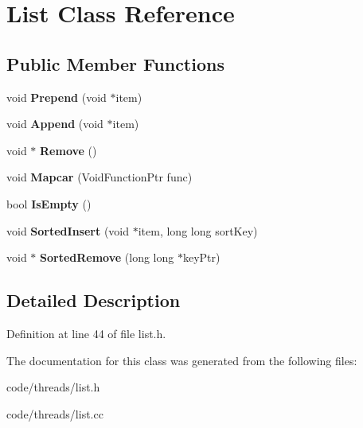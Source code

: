 \section{List Class Reference}
\label{class_list}
\subsection*{Public Member Functions}
\begin{DoxyCompactItemize}
\item 
void {\bfseries Prepend} (void $\ast$item)\label{class_list_a4058cbcd6b63f741faa40e3d782c28a8}

\item 
void {\bfseries Append} (void $\ast$item)\label{class_list_aea4cc7578bb4db7f502dc005e5edc902}

\item 
void $\ast$ {\bfseries Remove} ()\label{class_list_a4f804c07c4cfa4c9b631e6e117156e32}

\item 
void {\bfseries Mapcar} (Void\+Function\+Ptr func)\label{class_list_ab57e90b8b2a790db7f2cad1e7aaa72d3}

\item 
bool {\bfseries Is\+Empty} ()\label{class_list_a854e9656ddbfae181d12f9d9413bc2b8}

\item 
void {\bfseries Sorted\+Insert} (void $\ast$item, long long sort\+Key)\label{class_list_a7c19a72f21a238bfcad895331f47f97c}

\item 
void $\ast$ {\bfseries Sorted\+Remove} (long long $\ast$key\+Ptr)\label{class_list_aab7a88f9d140ed82a2ed84db03d71f7f}

\end{DoxyCompactItemize}


\subsection{Detailed Description}


Definition at line 44 of file list.\+h.



The documentation for this class was generated from the following files\+:\begin{DoxyCompactItemize}
\item 
code/threads/list.\+h\item 
code/threads/list.\+cc\end{DoxyCompactItemize}
